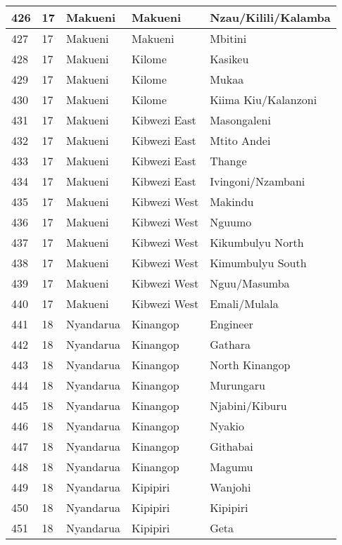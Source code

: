 \begin{table}[!ht]
\begin{tabular}{|l|l|l|l|l|}
        426 & 17 & Makueni & Makueni & Nzau/Kilili/Kalamba \\ \hline
        427 & 17 & Makueni & Makueni & Mbitini \\ \hline
        428 & 17 & Makueni & Kilome & Kasikeu \\ \hline
        429 & 17 & Makueni & Kilome & Mukaa \\ \hline
        430 & 17 & Makueni & Kilome & Kiima Kiu/Kalanzoni \\ \hline
        431 & 17 & Makueni & Kibwezi East & Masongaleni \\ \hline
        432 & 17 & Makueni & Kibwezi East & Mtito Andei \\ \hline
        433 & 17 & Makueni & Kibwezi East & Thange \\ \hline
        434 & 17 & Makueni & Kibwezi East & Ivingoni/Nzambani \\ \hline
        435 & 17 & Makueni & Kibwezi West & Makindu \\ \hline
        436 & 17 & Makueni & Kibwezi West & Nguumo \\ \hline
        437 & 17 & Makueni & Kibwezi West & Kikumbulyu North \\ \hline
        438 & 17 & Makueni & Kibwezi West & Kimumbulyu South \\ \hline
        439 & 17 & Makueni & Kibwezi West & Nguu/Masumba \\ \hline
        440 & 17 & Makueni & Kibwezi West & Emali/Mulala \\ \hline
        441 & 18 & Nyandarua & Kinangop & Engineer \\ \hline
        442 & 18 & Nyandarua & Kinangop & Gathara \\ \hline
        443 & 18 & Nyandarua & Kinangop & North Kinangop \\ \hline
        444 & 18 & Nyandarua & Kinangop & Murungaru \\ \hline
        445 & 18 & Nyandarua & Kinangop & Njabini/Kiburu \\ \hline
        446 & 18 & Nyandarua & Kinangop & Nyakio \\ \hline
        447 & 18 & Nyandarua & Kinangop & Githabai \\ \hline
        448 & 18 & Nyandarua & Kinangop & Magumu \\ \hline
        449 & 18 & Nyandarua & Kipipiri & Wanjohi \\ \hline
        450 & 18 & Nyandarua & Kipipiri & Kipipiri \\ \hline
        451 & 18 & Nyandarua & Kipipiri & Geta \\ \hline

\end{tabular}
\end{table}
